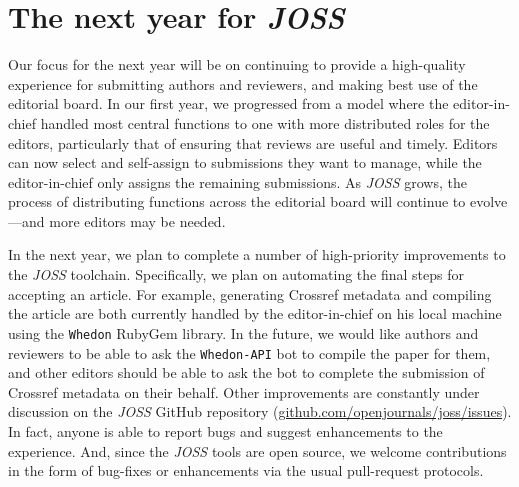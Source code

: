 \documentclass{article}
\newcommand{\add}[1]{{\sloppy\cbcolor{teal}\textcolor{teal}{\cbstart {#1}\cbend}}}  %
\newcommand\joss{\textit{JOSS}}
\begin{document}
\section{The next year for \joss{}}

Our focus for the next year will be on continuing to provide a high-quality experience
for submitting authors and reviewers, and making \add{the} best use of the editorial board.
In our first year, we progressed from a model where the editor-in-chief handled
most central functions to one with more distributed roles for the editors,
particularly that of ensuring that reviews are useful and timely.
Editors can now select and self-assign to submissions they want to manage, while the editor-in-chief only assigns the remaining submissions.
As \joss{} grows, the process of distributing functions across the editorial board will continue to evolve---and more editors may be needed.

In the next year, we plan to complete a number of high-priority improvements to the \joss{} toolchain.
Specifically, we plan on automating the final steps for accepting an article.
For example, generating Crossref metadata and compiling the article are both currently handled by the editor-in-chief on his local machine using the \texttt{Whedon} RubyGem library.
In the future, we would like authors and reviewers to be able to ask the \texttt{Whedon-API} bot to compile the paper for them, and other editors should be able to ask the bot to complete the submission of Crossref metadata on their behalf.
Other improvements are constantly under discussion on the \joss{} GitHub repository
(\href{https://github.com/openjournals/joss/issues}{github.com/openjournals/joss/issues}).
In fact, anyone is able to report bugs and suggest enhancements to the experience.
And, since the \joss{} tools are open source, we welcome contributions in the form of bug-fixes or enhancements via the usual pull-request protocols.
\end{document}
